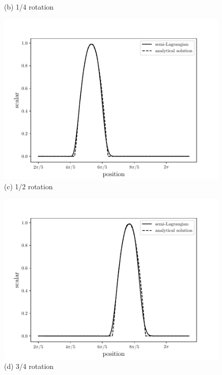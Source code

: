 \begin{center}
\begin{figure}[H]
\begin{minipage}{.5\linewidth}
      (b) 1/4 rotation
     \end{minipage}
     \begin{minipage}{.5\linewidth}
      \centering
      \includegraphics[scale=0.53]{./02_chaps/cap_validation/figure/SLquad2.pdf}\\
      (c) 1/2 rotation
     \end{minipage}%
     \begin{minipage}{.5\linewidth}
      \centering
      \includegraphics[scale=0.53]{./02_chaps/cap_validation/figure/SLquad3.pdf}\\
      (d) 3/4 rotation
     \end{minipage}
     \label{SL quad}
\end{figure}
\end{center}






